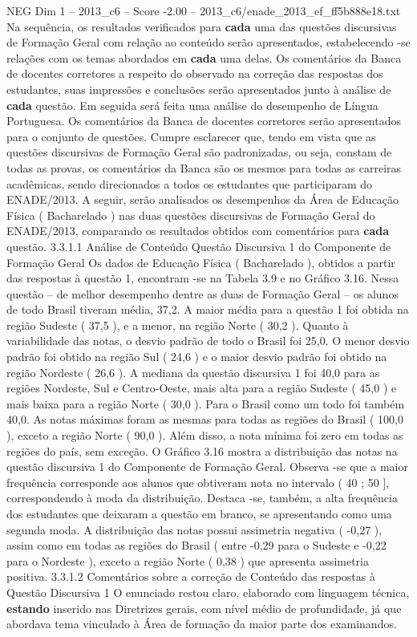 \begin{textsample}{NEG Dim 1 – 2013\_c6 – Score -2.00 – 2013\_c6/enade\_2013\_ef\_ff5b888e18.txt}
Na sequência, os resultados verificados para \textbf{cada} uma das questões discursivas de Formação Geral com relação ao conteúdo serão apresentados, estabelecendo -se relações com os temas abordados em \textbf{cada} uma delas.
Os comentários da Banca de docentes corretores a respeito do observado na correção das respostas dos estudantes, suas impressões e conclusões serão apresentados junto à análise de \textbf{cada} questão.
Em seguida será feita uma análise do desempenho de Língua Portuguesa.
Os comentários da Banca de docentes corretores serão apresentados para o conjunto de questões.
Cumpre esclarecer que, tendo em vista que as questões discursivas de Formação Geral são padronizadas, ou seja, constam de todas as provas, os comentários da Banca são os mesmos para todas as carreiras acadêmicas, sendo direcionados a todos os estudantes que participaram do ENADE/2013.
A seguir, serão analisados os desempenhos da Área de Educação Física ( Bacharelado ) nas duas questões discursivas de Formação Geral do ENADE/2013, comparando os resultados obtidos com comentários para \textbf{cada} questão. 3.3.1.1 Análise de Conteúdo Questão Discursiva 1 do Componente de Formação Geral Os dados de Educação Física ( Bacharelado ), obtidos a partir das respostas à questão 1, encontram -se na Tabela 3.9 e no Gráfico 3.16.
Nessa questão – de melhor desempenho dentre as duas de Formação Geral – os alunos de todo Brasil tiveram média, 37,2.
A maior média para a questão 1 foi obtida na região Sudeste ( 37,5 ), e a menor, na região Norte ( 30,2 ).
Quanto à variabilidade das notas, o desvio padrão de todo o Brasil foi 25,0.
O menor desvio padrão foi obtido na região Sul ( 24,6 ) e o maior desvio padrão foi obtido na região Nordeste ( 26,6 ).
A mediana da questão discursiva 1 foi 40,0 para as regiões Nordeste, Sul e Centro-Oeste, mais alta para a região Sudeste ( 45,0 ) e mais baixa para a região Norte ( 30,0 ).
Para o Brasil como um todo foi também 40,0.
As notas máximas foram as mesmas para todas as regiões do Brasil ( 100,0 ), exceto a região Norte ( 90,0 ).
Além disso, a nota mínima foi zero em todas as regiões do país, sem exceção.
O Gráfico 3.16 mostra a distribuição das notas na questão discursiva 1 do Componente de Formação Geral.
Observa -se que a maior frequência corresponde aos alunos que obtiveram nota no intervalo ( 40 ; 50 ], correspondendo à moda da distribuição.
Destaca -se, também, a alta frequência dos estudantes que deixaram a questão em branco, se apresentando como uma segunda moda.
A distribuição das notas possui assimetria negativa ( -0,27 ), assim como em todas as regiões do Brasil ( entre -0,29 para o Sudeste e -0,22 para o Nordeste ), exceto a região Norte ( 0,38 ) que apresenta assimetria positiva. 3.3.1.2 Comentários sobre a correção de Conteúdo das respostas à Questão Discursiva 1 O enunciado restou claro, elaborado com linguagem técnica, \textbf{estando} inserido nas Diretrizes gerais, com nível médio de profundidade, já que abordava tema vinculado à Área de formação da maior parte dos examinandos.

\end{textsample}
